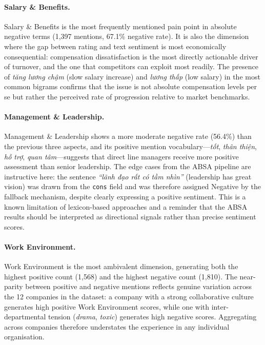 \documentclass[12pt, a4paper]{article}
\begin{document}
\paragraph{Salary \& Benefits.} Salary \& Benefits is the most frequently mentioned pain point in absolute negative terms (1,397 mentions, 67.1\% negative rate). It is also the dimension where the gap between rating and text sentiment is most economically consequential: compensation dissatisfaction is the most directly actionable driver of turnover, and the one that competitors can exploit most readily. The presence of \textit{tăng lương chậm} (slow salary increase) and \textit{lương thấp} (low salary) in the most common bigrams confirms that the issue is not absolute compensation levels per se but rather the perceived rate of progression relative to market benchmarks.

\paragraph{Management \& Leadership.} Management \& Leadership shows a more moderate negative rate (56.4\%) than the previous three aspects, and its positive mention vocabulary---\textit{tốt}, \textit{thân thiện}, \textit{hỗ trợ}, \textit{quan tâm}---suggests that direct line managers receive more positive assessment than senior leadership. The edge cases from the ABSA pipeline are instructive here: the sentence \textit{``lãnh đạo rất có tầm nhìn''} (leadership has great vision) was drawn from the \texttt{cons} field and was therefore assigned Negative by the fallback mechanism, despite clearly expressing a positive sentiment. This is a known limitation of lexicon-based approaches and a reminder that the ABSA results should be interpreted as directional signals rather than precise sentiment scores.

\paragraph{Work Environment.} Work Environment is the most ambivalent dimension, generating both the highest positive count (1,568) and the highest negative count (1,810). The near-parity between positive and negative mentions reflects genuine variation across the 12 companies in the dataset: a company with a strong collaborative culture generates high positive Work Environment scores, while one with inter-departmental tension (\textit{drama}, \textit{toxic}) generates high negative scores. Aggregating across companies therefore understates the experience in any individual organisation.
\end{document}
